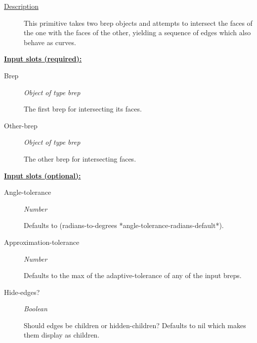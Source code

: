 \documentclass [11pt]{book}
\begin{document}
\begin{itemize}
\begin{description}
\item [
\underline{Description}]


This primitive takes two brep objects and attempts
to intersect the faces of the one with the faces of the other, yielding a 
sequence of edges which also behave as curves.



\end{description}








\textbf{
\underline{Input slots (required):}}

\begin{description}

\item [Brep]
\emph{Object of type brep}

 The first brep for intersecting its faces.




\item [Other-brep]
\emph{Object of type brep}

 The other brep for intersecting faces.




\end{description}






\textbf{
\underline{Input slots (optional):}}

\begin{description}

\item [Angle-tolerance]
\emph{Number}

 Defaults to (radians-to-degrees *angle-tolerance-radians-default*).




\item [Approximation-tolerance]
\emph{Number}

 Defaults to the max of the adaptive-tolerance of any of
the input breps.




\item [Hide-edges?]
\emph{Boolean}

 Should edges be children or hidden-children?
Defaults to nil which makes them display as children.





\end{description}
\end{itemize}
\end{document}
